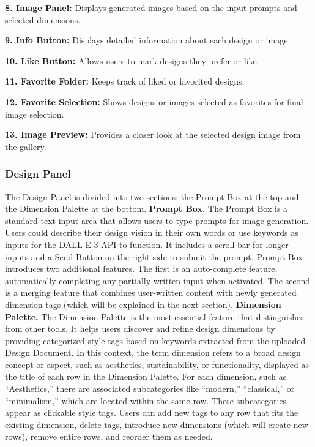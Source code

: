 \begin{figure*}[htbp]
{    \textbf{8. Image Panel:} Displays generated images based on the input prompts and selected dimensions.

    \textbf{9. Info Button:} Displays detailed information about each design or image.

    \textbf{10. Like Button:} Allows users to mark designs they prefer or like.

    \textbf{11. Favorite Folder:} Keeps track of liked or favorited designs.

    \textbf{12. Favorite Selection:} Shows designs or images selected as favorites for final image selection.

    \textbf{13. Image Preview:} Provides a closer look at the selected design image from the gallery.
    }
\end{figure*}

\subsubsection {Design Panel}
The Design Panel is divided into two sections: the Prompt Box at the top and the Dimension Palette at the bottom.
\newline
\textbf{Prompt Box.} The Prompt Box is a standard text input area that allows users to type prompts for image generation. Users could describe their design vision in their own words or use keywords as inputs for the DALL-E 3 API to function. It includes a scroll bar for longer inputs and a Send Button on the right side to submit the prompt. Prompt Box introduces two additional features. The first is an auto-complete feature, automatically completing any partially written input when activated. The second is a merging feature that combines user-written content with newly generated dimension tags (which will be explained in the next section). 
\newline
\textbf{Dimension Palette.} The Dimension Palette is the most essential feature that distinguishes \toolname{} from other tools. It helps users discover and refine design dimensions by providing categorized style tags based on keywords extracted from the uploaded Design Document. In this context, the term dimension refers to a broad design concept or aspect, such as aesthetics, sustainability, or functionality, displayed as the title of each row in the Dimension Palette. For each dimension, such as “Aesthetics,” there are associated subcategories like “modern,” “classical,” or “minimalism,” which are located within the same row. These subcategories appear as clickable style tags. Users can add new tags to any row that fits the existing dimension, delete tags, introduce new dimensions (which will create new rows), remove entire rows, and reorder them as needed. 

